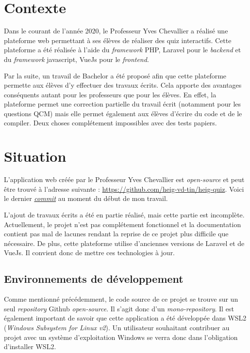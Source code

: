 
\section{Contexte}
Dans le courant de l'année 2020, le Professeur Yves Chevallier a réalisé une plateforme web permettant à ses élèves de réaliser des quiz interactifs. Cette plateforme a été réalisée à l'aide du \emph{framework} PHP, Laravel \cite{Laravel} pour le \emph{backend} et du \emph{framework} javascript, VueJs \cite{Vuejs} pour le \emph{frontend}.

Par la suite, un travail de Bachelor a été proposé afin que cette plateforme permette aux élèves d'y effectuer des travaux écrits. Cela apporte des avantages conséquents autant pour les professeurs que pour les élèves. En effet, la plateforme permet une correction partielle du travail écrit (notamment pour les questions QCM) mais elle permet également aux élèves d'écrire du code et de le compiler. Deux choses complétement impossibles avec des tests papiers.


\section{Situation}
L'application web créée par le Professeur Yves Chevallier est \emph{open-source} et peut être trouvé à l'adresse suivante : \url{https://github.com/heig-vd-tin/heig-quiz}. Voici le dernier \href{https://github.com/heig-vd-tin/heig-quiz/commit/28fb1ac5367931f6aa986041fb992c651c9816cd}{\emph{commit}} au moment du début de mon travail.

L'ajout de travaux écrits a été en partie réalisé, mais cette partie est incomplète. Actuellement, le projet n'est pas complétement fonctionnel et la documentation contient pas mal de lacunes rendant la reprise de ce projet plus difficile que nécessaire. De plus, cette plateforme utilise d'anciennes versions de Laravel et de VueJs. Il convient donc de mettre ces technologies à jour.

\subsection{Environnements de développement}
Comme mentionné précédemment, le code source de ce projet se trouve sur un seul \emph{repository} Github \emph{open-source}. Il s'agit donc d'un \emph{mono-repository}. Il est également important de savoir que cette application a été développée dans WSL2 (\emph{Windows Subsystem for Linux v2}). Un utilisateur souhaitant contribuer au projet avec un système d'exploitation Windows se verra donc dans l'obligation d'installer WSL2.

